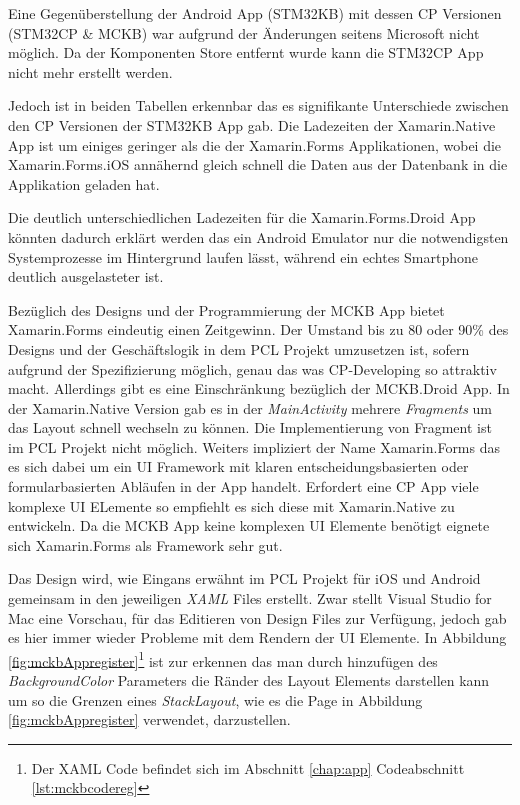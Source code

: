 	Eine Gegenüberstellung der Android App (STM32KB) mit dessen CP Versionen (STM32CP \& MCKB) war aufgrund der Änderungen seitens Microsoft nicht möglich. Da der Komponenten Store entfernt wurde kann die STM32CP App nicht mehr erstellt werden.

	Jedoch ist in beiden Tabellen erkennbar das es signifikante Unterschiede zwischen den CP Versionen der STM32KB App gab. Die Ladezeiten der Xamarin.Native App ist um einiges geringer als die der Xamarin.Forms Applikationen, wobei die Xamarin.Forms.iOS annähernd gleich schnell die Daten aus der Datenbank in die Applikation geladen hat.

	Die deutlich unterschiedlichen Ladezeiten für die Xamarin.Forms.Droid App könnten dadurch erklärt werden das ein Android Emulator nur die notwendigsten Systemprozesse im Hintergrund laufen lässt, während ein echtes Smartphone deutlich ausgelasteter ist.

	Bezüglich des Designs und der Programmierung der MCKB App bietet Xamarin.Forms eindeutig einen Zeitgewinn. Der Umstand bis zu 80 oder 90\% des Designs und der Geschäftslogik in dem PCL Projekt umzusetzen ist, sofern aufgrund der Spezifizierung möglich, genau das was CP-Developing so attraktiv macht. Allerdings gibt es eine Einschränkung bezüglich der MCKB.Droid App. In der Xamarin.Native Version gab es in der \textit{MainActivity} mehrere \textit{Fragments} um das Layout schnell wechseln zu können. Die Implementierung von Fragment ist im PCL Projekt nicht möglich. Weiters impliziert der Name Xamarin.Forms das es sich dabei um ein UI Framework mit klaren entscheidungsbasierten oder formularbasierten Abläufen in der App handelt. Erfordert eine CP App viele komplexe UI ELemente so empfiehlt es sich diese mit Xamarin.Native zu entwickeln. Da die MCKB App keine komplexen UI Elemente benötigt eignete sich Xamarin.Forms als Framework sehr gut.

	Das Design wird, wie Eingans erwähnt im PCL Projekt für iOS und Android gemeinsam in den jeweiligen \textit{XAML} Files erstellt. Zwar stellt Visual Studio for Mac eine Vorschau, für das Editieren von Design Files zur Verfügung, jedoch gab es hier immer wieder Probleme mit dem Rendern der UI Elemente. In Abbildung \ref{fig:mckbAppregister}\footnote{Der XAML Code befindet sich im Abschnitt \ref{chap:app} Codeabschnitt \ref{lst:mckbcodereg}} ist zur erkennen das man durch hinzufügen des \textit{BackgroundColor} Parameters die Ränder des Layout Elements darstellen kann um so die Grenzen eines \textit{StackLayout}, wie es die Page in Abbildung \ref{fig:mckbAppregister} verwendet, darzustellen.

